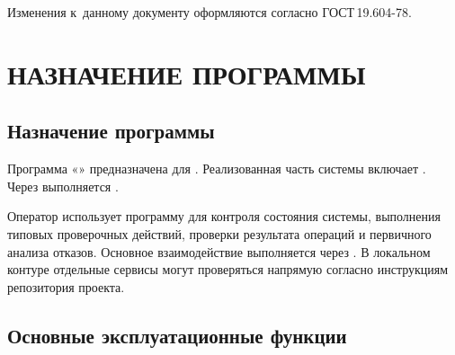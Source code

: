 \documentclass[12pt,a4paper]{extarticle}
\begin{document}
Изменения к~данному документу оформляются согласно ГОСТ\,19.604-78\cite{gost19604}.

\clearpage

\hypersetup{linkcolor=black}
\tableofcontents
\hypersetup{linkcolor=blue}
\thispagestyle{fancy}
\clearpage

\section{НАЗНАЧЕНИЕ ПРОГРАММЫ}

\subsection{Назначение программы}

\begin{hseExample}
Программа «\projectname» предназначена для . Реализованная часть системы включает . Через  выполняется .

Оператор использует программу для контроля состояния системы, выполнения типовых проверочных действий, проверки результата операций и первичного анализа отказов. Основное взаимодействие выполняется через . В локальном контуре отдельные сервисы могут проверяться напрямую согласно инструкциям репозитория проекта.
\end{hseExample}

\subsection{Основные эксплуатационные функции}
\end{document}

